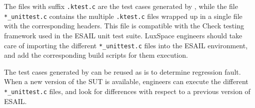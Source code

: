 The files with suffix \texttt{.ktest.c}  are the test cases generated by \SEMUS, while the file \texttt{*\_unittest.c} contains the multiple \texttt{.ktest.c} files wrapped up in a single file with the corresponding headers. This file is compatible with the Check testing framework used in the ESAIL unit test suite. LuxSpace engineers should take care of importing the different \texttt{*\_unittest.c} files into the ESAIL environment, and add the corresponding build scripts for them execution.

The test cases generated by \SEMUS can be reused as is to determine regression fault. When a new version of the SUT is available, engineers can execute the different \texttt{*\_unittest.c} files, and look for differences with respect to a previous version of ESAIL.
